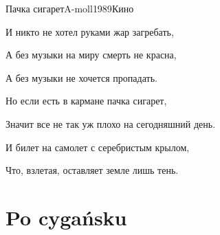 \documentclass[a4paper,draft]{book}
\begin{document}
\begin{otherlanguage}{russian}
\begin{song}{Пачка сигарет}{A-moll}{1989}{Кино}{}{}
\begin{SBVerse}
	И никто не хотел руками жар загребать,

	А без музыки на миру смерть не красна,

	А без музыки не хочется пропадать.
\end{SBVerse}

\begin{SBChorus}
	Но если есть в кармане пачка сигарет,

	Значит все не так уж плохо на сегодняшний день.

	И билет на самолет с серебристым крылом,

	Что, взлетая, оставляет земле лишь тень.
\end{SBChorus}

\end{song}

\end{otherlanguage}

\chapter{Po cygańsku}
\end{document}
